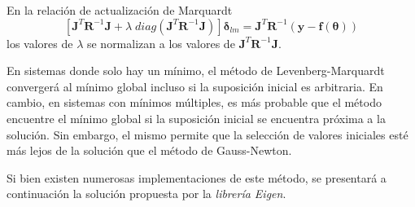 En la relación de actualización de Marquardt
\begin{equation}
    \left[\bm{J}^T\bm{R}^{-1}\bm{J} + \lambda\;  diag(\bm{J}^T\bm{R}^{-1}\bm{J})\right]\bm{\delta}_{lm} = \bm{J}^T\bm{R}^{-1}\left(\bm{y} - \bm{f}(\bm{\theta})\right)
\end{equation}{}
los valores de $\lambda$ se normalizan a los valores de $\bm{J}^T\bm{R}^{-1}\bm{J}$.

En sistemas donde solo hay un mínimo, el método de Levenberg-Marquardt convergerá al mínimo global incluso si la suposición inicial es arbitraria. En cambio, en sistemas con mínimos múltiples, es más probable que el método encuentre el mínimo global si la suposición inicial se encuentra próxima a la solución. Sin embargo, el mismo permite que la selección de valores iniciales esté más lejos de la solución que el método de Gauss-Newton.

Si bien existen numerosas implementaciones de este método, se presentará a continuación la solución propuesta por la \textit{librería Eigen}.
